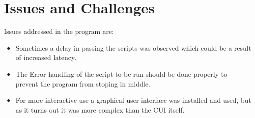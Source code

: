 \chapter{Issues and Challenges}
Issues addressed in the program are:
\begin{itemize}
\item Sometimes a delay in passing the scripts was observed which could be a result of increased latency.
\item The Error handling of the script to be run should be done properly to prevent the program from stoping in middle.
\item For more interactive use a graphical user interface was installed and used, but as it turns out it was more complex than the CUI itself.

\end{itemize}
